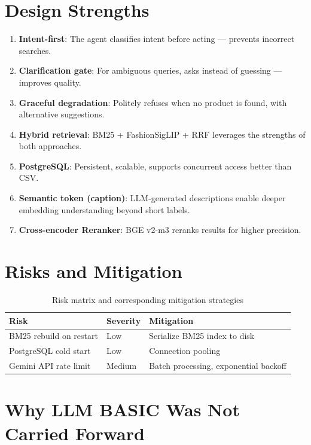 
\section{Design Strengths}
\begin{enumerate}
    \item \textbf{Intent-first}: The agent classifies intent before acting --- prevents incorrect searches.
    \item \textbf{Clarification gate}: For ambiguous queries, asks instead of guessing --- improves quality.
    \item \textbf{Graceful degradation}: Politely refuses when no product is found, with alternative suggestions.
    \item \textbf{Hybrid retrieval}: BM25 + FashionSigLIP + RRF leverages the strengths of both approaches.
    \item \textbf{PostgreSQL}: Persistent, scalable, supports concurrent access better than CSV.
    \item \textbf{Semantic token (caption)}: LLM-generated descriptions enable deeper embedding understanding beyond short labels.
    \item \textbf{Cross-encoder Reranker}: BGE v2-m3 reranks results for higher precision.
\end{enumerate}

\section{Risks and Mitigation}

\begin{table}[H]
\centering
\begin{tabular}{lll}
\toprule
\textbf{Risk} & \textbf{Severity} & \textbf{Mitigation}\\
\midrule

BM25 rebuild on restart              & Low    & Serialize BM25 index to disk\\
PostgreSQL cold start                & Low    & Connection pooling\\
Gemini API rate limit                & Medium & Batch processing, exponential backoff\\
\bottomrule
\end{tabular}
\caption{Risk matrix and corresponding mitigation strategies}
\end{table}

\section{Why LLM BASIC Was Not Carried Forward}
\label{sec:disc_llm_basic}


